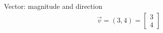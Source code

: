 \documentclass{article}
\begin{document}
	Vector: magnitude and direction
	\begin{align*}
			\vec{v} = (3, 4) = \begin{bmatrix} 3\\ 4 \end{bmatrix}
	\end{align*}
\end{document}
